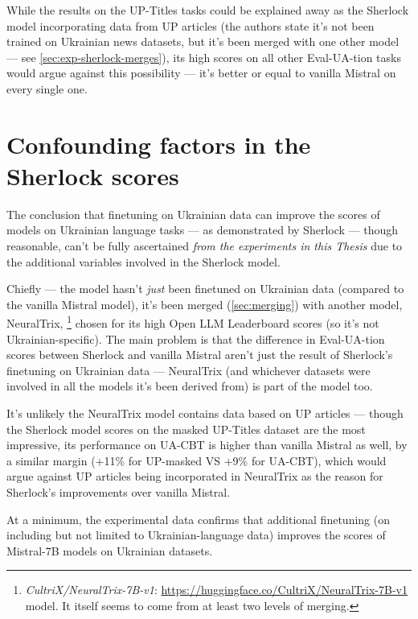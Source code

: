 While the results on the UP-Titles tasks could be explained away as the Sherlock model incorporating data from UP articles (the authors state it's not been trained on Ukrainian news datasets, but it's been merged with one other model — see \autoref{sec:exp-sherlock-merges}), its high scores on all other Eval-UA-tion tasks would argue against this possibility —
it's better or equal to vanilla Mistral on every single one.

\section{Confounding factors in the Sherlock scores}
\label{sec:exp-sherlock-merges}
The conclusion that finetuning on Ukrainian data can improve the scores of models on Ukrainian language tasks — as demonstrated by Sherlock — though reasonable, can't be fully ascertained \textit{from the experiments in this Thesis} due to the additional variables involved in the Sherlock model. 

Chiefly — the model hasn't \textit{just} been finetuned on Ukrainian data (compared to the vanilla Mistral model), it's been merged (\autoref{sec:merging}) with another model, NeuralTrix,%
\footnote{\textit{CultriX/NeuralTrix-7B-v1}: \href{https://huggingface.co/CultriX/NeuralTrix-7B-v1}{https://huggingface.co/CultriX/NeuralTrix-7B-v1} model. 
It itself seems to come from at least two levels of merging.}
chosen for its high Open LLM Leaderboard scores
(so it's not Ukrainian-specific).
The main problem is that the difference in Eval-UA-tion scores between Sherlock and vanilla Mistral aren't just the result of Sherlock's finetuning on Ukrainian data — NeuralTrix (and whichever datasets were involved in all the models it's been derived from) is part of the model too.

It's unlikely the NeuralTrix model contains data based on UP articles — though the Sherlock model scores on the masked UP-Titles dataset are the most impressive, its performance on UA-CBT is higher than vanilla Mistral as well, by a similar margin (+11\% for UP-masked VS +9\% for UA-CBT), which would argue against UP articles being incorporated in NeuralTrix as the reason for Sherlock's improvements over vanilla Mistral.

At a minimum, the experimental data confirms that additional finetuning (on including but not limited to Ukrainian-language data) improves the scores of Mistral-7B models on Ukrainian datasets.

